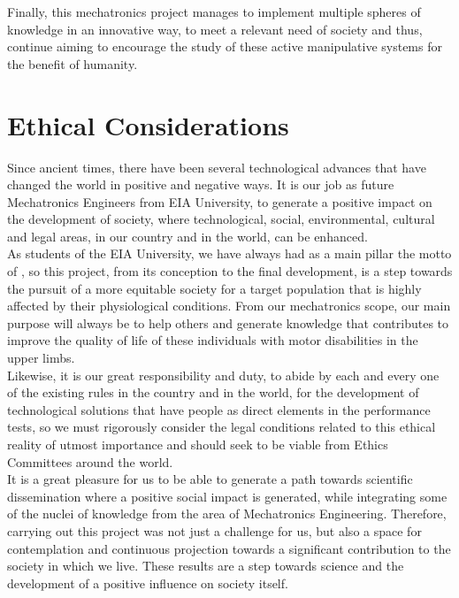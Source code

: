 \documentclass[11pt]{report} %
\begin{document}
Finally, this mechatronics project manages to implement multiple spheres of knowledge in an innovative way, to meet a relevant need of society and thus, continue aiming to encourage the study of these active manipulative systems for the benefit of humanity.\\


\chapter{Ethical Considerations}

Since ancient times, there have been several technological advances that have changed the world in positive and negative ways. It is our job as future Mechatronics Engineers from EIA University, to generate a positive impact on the development of society, where technological, social, environmental, cultural and legal areas, in our country and in the world, can be enhanced.\\

As students of the EIA University, we have always had as a main pillar the motto of , so this project, from its conception to the final development, is a step towards the pursuit of a more equitable society for a target population that is highly affected by their physiological conditions. From our mechatronics scope, our main purpose will always be to help others and generate knowledge that contributes to improve the quality of life of these individuals with motor disabilities in the upper limbs.\\

Likewise, it is our great responsibility and duty, to abide by each and every one of the existing rules in the country and in the world, for the development of technological solutions that have people as direct elements in the performance tests, so we must rigorously consider the legal conditions related to this ethical reality of utmost importance and should seek to be viable from Ethics Committees around the world.\\

It is a great pleasure for us to be able to generate a path towards scientific dissemination where a positive social impact is generated, while integrating some of the nuclei of knowledge from the area of Mechatronics Engineering. Therefore, carrying out this project was not just a challenge for us, but also a space for contemplation and continuous projection towards a significant contribution to the society in which we live. These results are a step towards science and the development of a positive influence on society itself.\\
\end{document}
